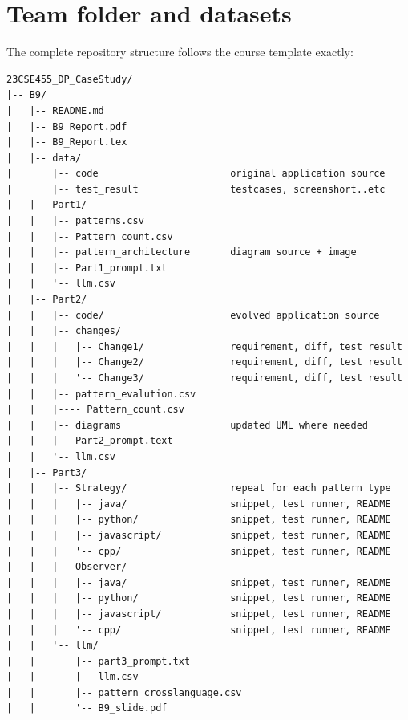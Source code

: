 \documentclass[11pt,a4paper]{article}
\begin{document}
\section{Team folder and datasets}
The complete repository structure follows the course template exactly:
\begin{verbatim}
23CSE455_DP_CaseStudy/
|-- B9/
|   |-- README.md
|   |-- B9_Report.pdf
|   |-- B9_Report.tex
|   |-- data/
|       |-- code                       original application source
|       |-- test_result                testcases, screenshort..etc
|   |-- Part1/
|   |   |-- patterns.csv
|   |   |-- Pattern_count.csv
|   |   |-- pattern_architecture       diagram source + image
|   |   |-- Part1_prompt.txt
|   |   '-- llm.csv
|   |-- Part2/
|   |   |-- code/                      evolved application source
|   |   |-- changes/
|   |   |   |-- Change1/               requirement, diff, test result
|   |   |   |-- Change2/               requirement, diff, test result
|   |   |   '-- Change3/               requirement, diff, test result
|   |   |-- pattern_evalution.csv
|   |   |---- Pattern_count.csv
|   |   |-- diagrams                   updated UML where needed
|   |   |-- Part2_prompt.text
|   |   '-- llm.csv
|   |-- Part3/
|   |   |-- Strategy/                  repeat for each pattern type
|   |   |   |-- java/                  snippet, test runner, README
|   |   |   |-- python/                snippet, test runner, README
|   |   |   |-- javascript/            snippet, test runner, README
|   |   |   '-- cpp/                   snippet, test runner, README
|   |   |-- Observer/
|   |   |   |-- java/                  snippet, test runner, README
|   |   |   |-- python/                snippet, test runner, README
|   |   |   |-- javascript/            snippet, test runner, README
|   |   |   '-- cpp/                   snippet, test runner, README
|   |   '-- llm/
|   |       |-- part3_prompt.txt
|   |       |-- llm.csv
|   |       |-- pattern_crosslanguage.csv
|   |       '-- B9_slide.pdf
\end{verbatim}
\end{document}

